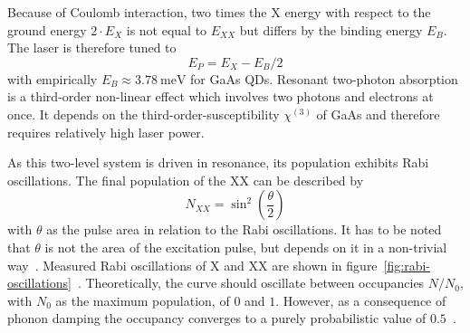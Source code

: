 Because of Coulomb interaction, two times the \ac{X} energy with respect to the ground energy $2 \cdot E_X$ is not equal to $E_{XX}$ but differs by the binding energy $E_B$.
The laser is therefore tuned to
\begin{equation}
\label{eq:e_p}
E_P = E_X - E_B / 2
\end{equation}
with empirically $E_B \approx \SI{3.78}{\milli \electronvolt}$ for GaAs \acp{QD}.
Resonant two-photon absorption is a third-order non-linear effect which involves two photons and electrons at once.
It depends on the third-order-susceptibility $\chi^{(3)}$ of GaAs and therefore requires relatively high laser power.

As this two-level system is driven in resonance, its population exhibits Rabi oscillations.
The final population of the \ac{XX} can be described by
\begin{equation}
\label{eq:n-xx}
N_{XX} = \sin^2\left(\frac{\theta}{2}\right)
\end{equation}
with $\theta$ as the pulse area in relation to the Rabi oscillations.
It has to be noted that $\theta$ is not the area of the excitation pulse, but depends on it in a non-trivial way~\cite{stufler_two-photon_2006}.
Measured Rabi oscillations of \ac{X} and \ac{XX} are shown in figure~\ref{fig:rabi-oscillations}~\cite{reindl_phonon-assisted_2017}.
Theoretically, the curve should oscillate between occupancies $N/N_0$, with $N_0$ as the maximum population, of $0$ and $1$.
However, as a consequence of phonon damping the occupancy converges to a purely probabilistic value of $0.5$~\cite{forstner_phonon-assisted_2003}.
